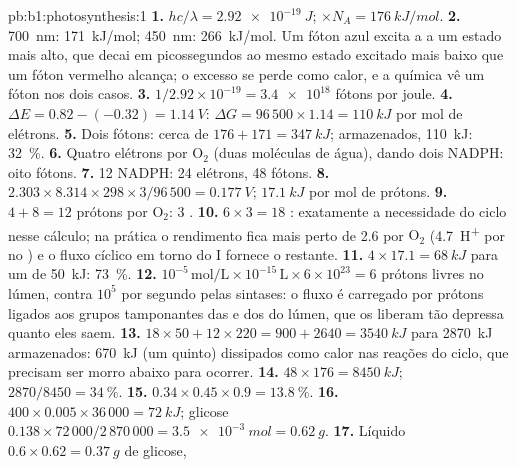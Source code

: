 \begin{solution}{pb:b1:photosynthesis:1}
\textbf{1.} $hc/\lambda = \qty{2.92e-19}{J}$; $\times N_A = \qty{176}{kJ/mol}$.
\textbf{2.} \qty{700}{nm}: \qty{171}{kJ/mol}; \qty{450}{nm}:
\qty{266}{kJ/mol}. Um fóton azul excita a  a um estado mais
alto, que decai em picossegundos ao mesmo estado excitado mais baixo que
um fóton vermelho alcança; o excesso se perde como calor, e a química vê
um fóton nos dois casos.
\textbf{3.} $1/2.92\times 10^{-19} = \num{3.4e18}$ fótons por joule.
\textbf{4.} $\Delta E = 0.82 - (-0.32) = \qty{1.14}{V}$: $\Delta G =
96\,500\times 1.14 = \qty{110}{kJ}$ por mol de elétrons.
\textbf{5.} Dois fótons: cerca de $176 + 171 = \qty{347}{kJ}$;
armazenados, \qty{110}{kJ}: \qty{32}{\%}.
\textbf{6.} Quatro elétrons por $\mathrm{O_2}$ (duas moléculas de água),
dando dois NADPH: oito fótons.
\textbf{7.} 12 NADPH: 24 elétrons, 48 fótons.
\textbf{8.} $2.303\times 8.314\times 298\times 3/96\,500 = \qty{0.177}{V}$;
$\qty{17.1}{kJ}$ por mol de prótons.
\textbf{9.} $4 + 8 = 12$ prótons por $\mathrm{O_2}$: 3 .
\textbf{10.} $6\times 3 = 18$ : exatamente a necessidade do ciclo
nesse cálculo; na prática o rendimento fica mais perto de 2.6 por
$\mathrm{O_2}$ (\qty{4.7}{H^+} por  no ) e o fluxo cíclico
em torno do  I fornece o restante.
\textbf{11.} $4\times 17.1 = \qty{68}{kJ}$ para um  de \qty{50}{kJ}:
\qty{73}{\%}.
\textbf{12.} $10^{-5}\,\mathrm{mol/L}\times 10^{-15}\,\mathrm{L}\times
6\times 10^{23} = 6$ prótons livres no lúmen, contra $10^5$ por segundo
pelas sintases: o fluxo é carregado por prótons ligados aos grupos
tamponantes das  e dos  do lúmen, que os liberam tão
depressa quanto eles saem.
\textbf{13.} $18\times 50 + 12\times 220 = 900 + 2640 = \qty{3540}{kJ}$
para \qty{2870}{kJ} armazenados: \qty{670}{kJ} (um quinto) dissipados
como calor nas reações do ciclo, que precisam ser morro abaixo para
ocorrer.
\textbf{14.} $48\times 176 = \qty{8450}{kJ}$; $2870/8450 = \qty{34}{\%}$.
\textbf{15.} $0.34\times 0.45\times 0.9 = \qty{13.8}{\%}$.
\textbf{16.} $400\times 0.005\times 36\,000 = \qty{72}{kJ}$; glicose
$0.138\times 72\,000/2\,870\,000 = \qty{3.5e-3}{mol} = \qty{0.62}{g}$.
\textbf{17.} Líquido $0.6\times 0.62 = \qty{0.37}{g}$ de glicose,

\end{solution}
